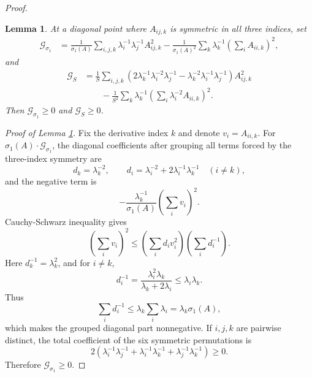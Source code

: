 \documentclass[10pt,a4paper]{amsart}
\newtheorem{lemma}{Lemma}
\begin{document}
\begin{proof}
\begin{lemma}\label{third forms}
At a diagonal point where $A_{ij,k}$ is symmetric in all three indices, set
\[
\begin{split}
        \mathcal G_{\sigma_1}
        &=\frac{1}{\sigma_1(A)}
        \sum_{i,j,k}\lambda_i^{-1}\lambda_j^{-1}A_{ij,k}^2
        -\frac{1}{\sigma_1(A)^2}
        \sum_k\lambda_k^{-1}\left(\sum_iA_{ii,k}\right)^2,
\end{split}
\]
and
\[
\begin{split}
        \mathcal G_S
        &=\frac{1}{S}
        \sum_{i,j,k}
        \left(2\lambda_k^{-1}\lambda_i^{-2}\lambda_j^{-1}
        -\lambda_k^{-2}\lambda_i^{-1}\lambda_j^{-1}\right)A_{ij,k}^2\\
        &\qquad
        -\frac{1}{S^2}
        \sum_k\lambda_k^{-1}
        \left(\sum_i\lambda_i^{-2}A_{ii,k}\right)^2.
\end{split}
\]
Then $\mathcal G_{\sigma_1}\geq0$ and $\mathcal G_S\geq0$.
\end{lemma}

\noindent\emph{Proof of Lemma \ref{third forms}.}
Fix the derivative index $k$ and denote $v_i=A_{ii,k}$. For
$\sigma_1(A)\cdot\mathcal G_{\sigma_1}$, the diagonal coefficients after grouping all terms
forced by the three-index symmetry are
\[
        d_k=\lambda_k^{-2},\qquad
        d_i=\lambda_i^{-2}+2\lambda_i^{-1}\lambda_k^{-1}\quad (i\ne k),
\]
and the negative term is
\[
        -\frac{\lambda_k^{-1}}{\sigma_1(A)}
        \left(\sum_i v_i\right)^2.
\]
Cauchy-Schwarz inequality gives
\[
        \left(\sum_i v_i\right)^2
        \leq \left(\sum_i d_i v_i^2\right)\left(\sum_i d_i^{-1}\right).
\]
Here $d_k^{-1}=\lambda_k^2$, and for $i\ne k$,
\[
        d_i^{-1}
        =\frac{\lambda_i^2\lambda_k}{\lambda_k+2\lambda_i}
        \leq \lambda_i\lambda_k.
\]
Thus
\[
        \sum_i d_i^{-1}\leq \lambda_k\sum_i\lambda_i
        =\lambda_k\sigma_1(A),
\]
which makes the grouped diagonal part nonnegative. If $i,j,k$ are pairwise
distinct, the total coefficient of the six symmetric permutations is
\[
        2(\lambda_i^{-1}\lambda_j^{-1}
        +\lambda_i^{-1}\lambda_k^{-1}
        +\lambda_j^{-1}\lambda_k^{-1})\geq0.
\]
Therefore $\mathcal G_{\sigma_1}\geq0$.


\end{proof}
\end{document}
